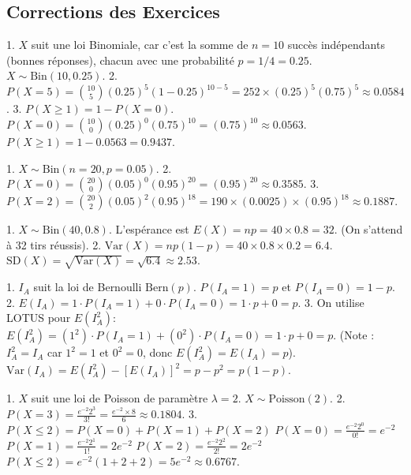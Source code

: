 
\subsection{Corrections des Exercices}

\begin{correctionbox}
1. $X$ suit une loi Binomiale, car c'est la somme de $n=10$ succès indépendants (bonnes réponses), chacun avec une probabilité $p = 1/4 = 0.25$. $X \sim \text{Bin}(10, 0.25)$.
2. $P(X=5) = \binom{10}{5} (0.25)^5 (1-0.25)^{10-5} = 252 \times (0.25)^5 (0.75)^5 \approx 0.0584$.
3. $P(X \ge 1) = 1 - P(X=0)$.
$P(X=0) = \binom{10}{0} (0.25)^0 (0.75)^{10} = (0.75)^{10} \approx 0.0563$.
$P(X \ge 1) = 1 - 0.0563 = 0.9437$.
\end{correctionbox}

\begin{correctionbox}
1. $X \sim \text{Bin}(n=20, p=0.05)$.
2. $P(X=0) = \binom{20}{0} (0.05)^0 (0.95)^{20} = (0.95)^{20} \approx 0.3585$.
3. $P(X=2) = \binom{20}{2} (0.05)^2 (0.95)^{18} = 190 \times (0.0025) \times (0.95)^{18} \approx 0.1887$.
\end{correctionbox}

\begin{correctionbox}
1. $X \sim \text{Bin}(40, 0.8)$. L'espérance est $E(X) = np = 40 \times 0.8 = 32$. (On s'attend à 32 tirs réussis).
2. $\text{Var}(X) = np(1-p) = 40 \times 0.8 \times 0.2 = 6.4$.
$\text{SD}(X) = \sqrt{\text{Var}(X)} = \sqrt{6.4} \approx 2.53$.
\end{correctionbox}

\begin{correctionbox}
1. $I_A$ suit la loi de Bernoulli $\text{Bern}(p)$.
$P(I_A=1) = p$ et $P(I_A=0) = 1-p$.
2. $E(I_A) = 1 \cdot P(I_A=1) + 0 \cdot P(I_A=0) = 1 \cdot p + 0 = p$.
3. On utilise LOTUS pour $E(I_A^2)$:
$E(I_A^2) = (1^2) \cdot P(I_A=1) + (0^2) \cdot P(I_A=0) = 1 \cdot p + 0 = p$.
(Note : $I_A^2 = I_A$ car $1^2=1$ et $0^2=0$, donc $E(I_A^2) = E(I_A) = p$).
$\text{Var}(I_A) = E(I_A^2) - [E(I_A)]^2 = p - p^2 = p(1-p)$.
\end{correctionbox}

\begin{correctionbox}
1. $X$ suit une loi de Poisson de paramètre $\lambda=2$. $X \sim \text{Poisson}(2)$.
2. $P(X=3) = \frac{e^{-2} 2^3}{3!} = \frac{e^{-2} \times 8}{6} \approx 0.1804$.
3. $P(X \le 2) = P(X=0) + P(X=1) + P(X=2)$
$P(X=0) = \frac{e^{-2} 2^0}{0!} = e^{-2}$
$P(X=1) = \frac{e^{-2} 2^1}{1!} = 2e^{-2}$
$P(X=2) = \frac{e^{-2} 2^2}{2!} = 2e^{-2}$
$P(X \le 2) = e^{-2}(1 + 2 + 2) = 5e^{-2} \approx 0.6767$.
\end{correctionbox}

